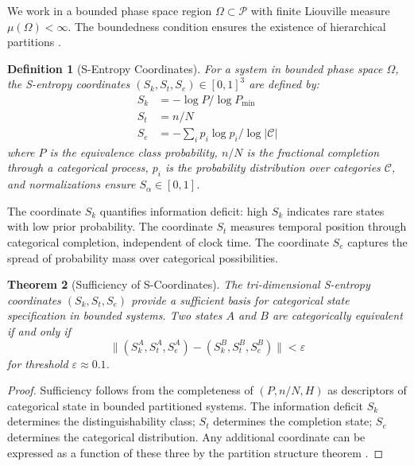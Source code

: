 \documentclass[aps,prl,twocolumn,superscriptaddress,showpacs]{revtex4-2}
\newtheorem{theorem}{Theorem}[section]
\newtheorem{definition}[theorem]{Definition}
\newcommand{\Pspace}{\mathcal{P}}
\newcommand{\Sk}{S_k}
\newcommand{\St}{S_t}
\newcommand{\Se}{S_e}
\begin{document}
We work in a bounded phase space region $\Omega \subset \Pspace$ with finite Liouville measure $\mu(\Omega) < \infty$. The boundedness condition ensures the existence of hierarchical partitions \cite{gibbs1902elementary, arnold1989mathematical}.

\begin{definition}[S-Entropy Coordinates]
For a system in bounded phase space $\Omega$, the S-entropy coordinates $(\Sk, \St, \Se) \in [0,1]^3$ are defined by:
\begin{align}
\Sk &= -\log P / \log P_{\min} \label{eq:sk} \\
\St &= n/N \label{eq:st} \\
\Se &= -\sum_i p_i \log p_i / \log |\mathcal{C}| \label{eq:se}
\end{align}
where $P$ is the equivalence class probability, $n/N$ is the fractional completion through a categorical process, $p_i$ is the probability distribution over categories $\mathcal{C}$, and normalizations ensure $S_\alpha \in [0,1]$.
\end{definition}

The coordinate $\Sk$ quantifies information deficit: high $\Sk$ indicates rare states with low prior probability. The coordinate $\St$ measures temporal position through categorical completion, independent of clock time. The coordinate $\Se$ captures the spread of probability mass over categorical possibilities.

\begin{theorem}[Sufficiency of S-Coordinates]
\label{thm:sufficiency}
The tri-dimensional S-entropy coordinates $(\Sk, \St, \Se)$ provide a sufficient basis for categorical state specification in bounded systems. Two states $A$ and $B$ are categorically equivalent if and only if
\begin{equation}
\|(\Sk^A, \St^A, \Se^A) - (\Sk^B, \St^B, \Se^B)\| < \varepsilon
\end{equation}
for threshold $\varepsilon \approx 0.1$.
\end{theorem}

\begin{proof}
Sufficiency follows from the completeness of $(P, n/N, H)$ as descriptors of categorical state in bounded partitioned systems. The information deficit $\Sk$ determines the distinguishability class; $\St$ determines the completion state; $\Se$ determines the categorical distribution. Any additional coordinate can be expressed as a function of these three by the partition structure theorem \cite{cover2006elements}.
\end{proof}
\end{document}
